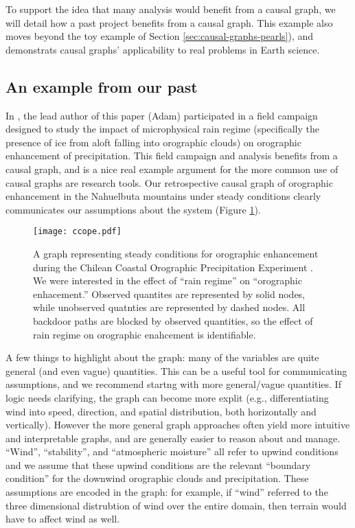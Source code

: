 \documentclass[12pt]{article}
\begin{document}
To support the idea that many analysis would benefit from a causal
graph, we will detail how a past project benefits from a causal
graph. This example also moves beyond the toy example of Section
\ref{sec:causal-graphs-pearls}), and demonstrats causal graphs'
applicability to real problems in Earth science.

\subsection{An example from our past}

In \citet{massmann2017}, the lead author of this paper (Adam)
participated in a field campaign designed to study the impact of
microphysical rain regime (specifically the presence of ice from aloft
falling into orographic clouds) on orographic enhancement of
precipitation. This field campaign and analysis benefits from a causal
graph, and is a nice real example argument for the more common use of
causal graphs are research tools. Our retrospective causal graph of
orographic enhancement in the Nahuelbuta mountains under steady
conditions clearly communicates our assumptions about the system
(Figure \ref{fig:ccope}).

\begin{figure}
  \texttt{[image: ccope.pdf]}
  \caption{A graph representing steady conditions for orographic
    enhancement during the Chilean Coastal Orographic Precipitation
    Experiment \citep[CCOPE,][]{massmann2017}. We were interested in
    the effect of ``rain regime'' on ``orographic enhacement.''
    Observed quantites are represented by solid nodes, while
    unobserved quatnties are represented by dashed nodes. All backdoor
    paths are blocked by observed quantities, so the effect of rain
    regime on orographic enahcement is identifiable.}
  \label{fig:ccope}
\end{figure}

A few things to highlight about the graph: many of the variables are
quite general (and even vague) quantities. This can be a useful tool
for communicating assumptions, and we recommend startng with more
general/vague quantities. If logic needs clarifying, the graph can
become more explit (e.g., differentiating wind into speed, direction,
and spatial distribution, both horizontally and vertically). However
the more general graph approaches often yield more intuitive and
interpretable graphs, and are generally easier to reason about and
manage. ``Wind'', ``stability'', and ``atmospheric moisture'' all
refer to upwind conditions and we assume that these upwind conditions
are the relevant ``boundary condition'' for the downwind orographic
clouds and precipitation. These assumptions are encoded in the graph:
for example, if ``wind'' referred to the three dimensional distrubtion
of wind over the entire domain, then terrain would have to affect wind
as well.
\end{document}
